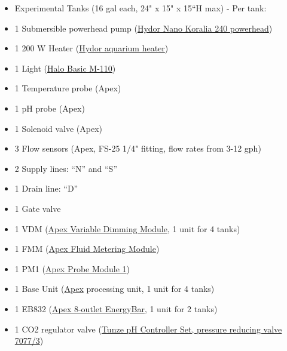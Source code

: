 \documentclass[]{book}
\providecommand{\tightlist}{%
  \setlength{\itemsep}{0pt}\setlength{\parskip}{0pt}}
\begin{document}
\begin{itemize}
\tightlist
\item
  Experimental Tanks (16 gal each, 24" x 15" x 15``H max) - Per tank:\\
\item
  1 Submersible powerhead pump (\href{Manuals/Hydor_Nano_Pump.pdf}{Hydor
  Nano Koralia 240 powerhead})\\
\item
  1 200 W Heater (\href{Manuals/Hydor_Heater.pdf}{Hydor aquarium
  heater})\\
\item
  1 Light (\href{Manuals/Apex_Halo.pdf}{Halo Basic M-110})\\
\item
  1 Temperature probe (Apex)\\
\item
  1 pH probe (Apex)\\
\item
  1 Solenoid valve (Apex)\\
\item
  3 Flow sensors (Apex, FS-25 1/4" fitting, flow rates from 3-12 gph)\\
\item
  2 Supply lines: ``N'' and ``S''
\item
  1 Drain line: ``D''
\item
  1 Gate valve\\
\item
  1 VDM (\href{Manuals/VDM_manual.pdf}{Apex Variable Dimming Module}, 1
  unit for 4 tanks)\\
\item
  1 FMM (\href{https://www.neptunesystems.com/getstarted/fmk/}{Apex
  Fluid Metering Module})\\
\item
  1 PM1 (\href{Manuals/PM1_manual.pdf}{Apex Probe Module 1})\\
\item
  1 Base Unit
  (\href{Manuals/Apex_Comprehensive_Reference_Manual.pdf}{Apex}
  processing unit, 1 unit for 4 tanks)\\
\item
  1 EB832 (\href{Manuals/EB832_Guide.pdf}{Apex 8-outlet EnergyBar}, 1
  unit for 2 tanks)\\
\item
  1 CO2 regulator valve (\href{Manuals/Tunze_CO2_Regulator.pdf}{Tunze pH
  Controller Set, pressure reducing valve 7077/3})
\end{itemize}
\end{document}
